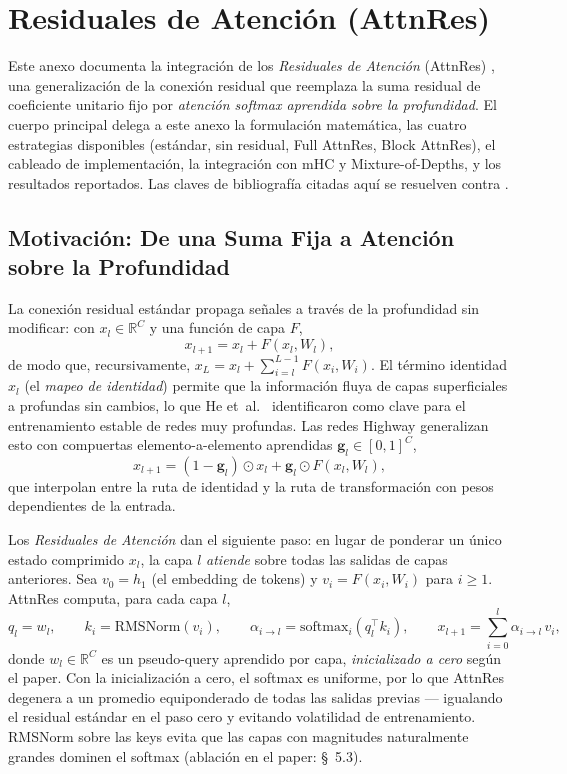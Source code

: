 \section{Residuales de Atención (AttnRes)}
\label{sec:annex-attnres}

Este anexo documenta la integración de los \emph{Residuales de Atención}
(AttnRes) \citep{sun_attnres_2026}, una generalización de la conexión
residual que reemplaza la suma residual de coeficiente unitario fijo
por \emph{atención softmax aprendida sobre la profundidad}. El cuerpo
principal delega a este anexo la formulación matemática, las cuatro
estrategias disponibles (estándar, sin residual, Full AttnRes, Block
AttnRes), el cableado de implementación, la integración con mHC y
Mixture-of-Depths, y los resultados reportados. Las claves de
bibliografía citadas aquí se resuelven contra
.

\subsection{Motivación: De una Suma Fija a Atención sobre la Profundidad}

La conexión residual estándar \citep{he_deep_2016} propaga señales a
través de la profundidad sin modificar: con $x_l \in \mathbb{R}^{C}$ y
una función de capa $F$,
\[
x_{l+1} = x_l + F(x_l, W_l),
\]
de modo que, recursivamente,
$x_L = x_l + \sum_{i=l}^{L-1} F(x_i, W_i)$. El término identidad $x_l$
(el \emph{mapeo de identidad}) permite que la información fluya de
capas superficiales a profundas sin cambios, lo que He
et~al.~\citep{he_deep_2016} identificaron como clave para el
entrenamiento estable de redes muy profundas. Las redes Highway
\citep{srivastava_highway_2015} generalizan esto con compuertas
elemento-a-elemento aprendidas $\mathbf{g}_l \in [0, 1]^{C}$,
\[
x_{l+1} = (1 - \mathbf{g}_l) \odot x_l + \mathbf{g}_l \odot F(x_l, W_l),
\]
que interpolan entre la ruta de identidad y la ruta de transformación
con pesos dependientes de la entrada.

Los \emph{Residuales de Atención} \citep{sun_attnres_2026} dan el
siguiente paso: en lugar de ponderar un único estado comprimido $x_l$,
la capa $l$ \emph{atiende} sobre todas las salidas de capas anteriores.
Sea $v_0 = h_1$ (el embedding de tokens) y $v_i = F(x_i, W_i)$ para
$i \ge 1$. AttnRes computa, para cada capa $l$,
\[
q_l = w_l, \qquad
k_i = \mathrm{RMSNorm}(v_i), \qquad
\alpha_{i \to l} = \mathrm{softmax}_i(q_l^{\top} k_i), \qquad
x_{l+1} = \sum_{i=0}^{l} \alpha_{i \to l} \, v_i,
\]
donde $w_l \in \mathbb{R}^{C}$ es un pseudo-query aprendido por capa,
\emph{inicializado a cero} según el paper. Con la inicialización a cero,
el softmax es uniforme, por lo que AttnRes degenera a un promedio
equiponderado de todas las salidas previas --- igualando el residual
estándar en el paso cero y evitando volatilidad de entrenamiento.
RMSNorm sobre las keys evita que las capas con magnitudes
naturalmente grandes dominen el softmax (ablación en el paper:
\S~5.3).

